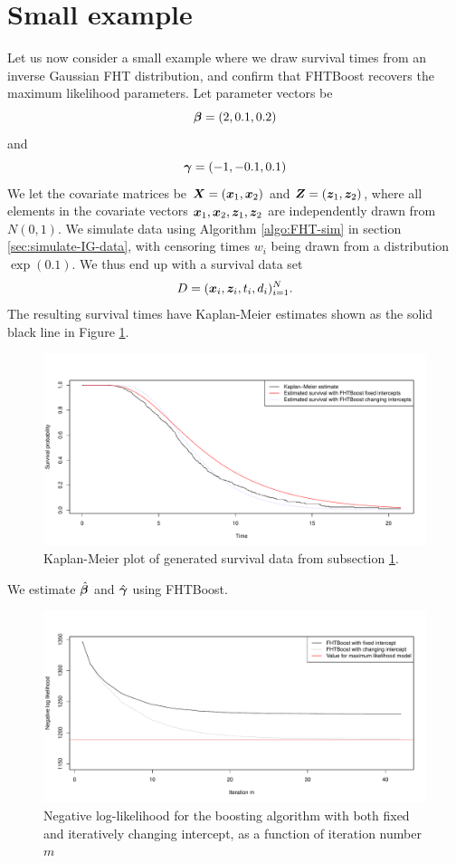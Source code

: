 \section{Small example}
\label{subsec:algo-example}
Let us now consider a small example where we draw survival times from an inverse Gaussian FHT distribution, and confirm that FHTBoost recovers the maximum likelihood parameters.
Let parameter vectors be
\begin{equation*}
    \boldsymbol{\beta}=(2,0.1,0.2)
\end{equation*}
and
\begin{equation*}
    \boldsymbol{\gamma}=(-1, -0.1, 0.1)
\end{equation*}
We let the covariate matrices be $\bm{X}=(\bm{x}_1,\bm{x}_2)$ and $\bm{Z}=(\bm{z}_1,\bm{z}_2)$, where all elements in the covariate vectors $\bm{x}_1,\bm{x}_2,\bm{z}_1,\bm{z}_2$ are independently drawn from $N(0,1)$.
We simulate data using Algorithm \ref{algo:FHT-sim} in section \ref{sec:simulate-IG-data}, with censoring times $w_i$ being drawn from a distribution $\exp(0.1)$.
We thus end up with a survival data set
\begin{equation*}
    D=(\bm{x}_i,\bm{z}_i,t_i,d_i)_{i=1}^N.
\end{equation*}
The resulting survival times have Kaplan-Meier estimates shown as the solid black line in Figure \ref{fig:small-example-kaplan-meier}.
\begin{figure}
\caption{Kaplan-Meier plot of generated survival data from subsection \ref{subsec:algo-example}.}
\label{fig:small-example-kaplan-meier}
\centering\includegraphics[scale=0.4]{figures/kaplan_meier_small.pdf}
\end{figure}
We estimate $\hat{\boldsymbol{\beta}}$ and $\hat{\boldsymbol{\gamma}}$ using FHTBoost.
\begin{figure}
\caption{Negative log-likelihood for the boosting algorithm with both fixed and iteratively changing intercept, as a function of iteration number $m$}
\label{fig:boosting-ML}
\centering\includegraphics[scale=0.4]{figures/small_example.pdf}
\end{figure}
